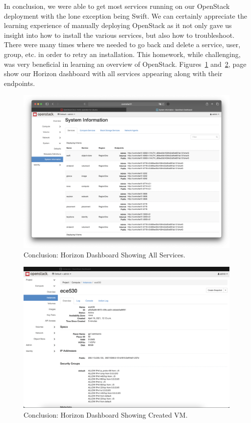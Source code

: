 \documentclass{article}
\begin{document}
In conclusion, we were able to get most services running on our OpenStack deployment with the lone exception being Swift. We can certainly appreciate the learning experience of manually deploying OpenStack as it not only gave us insight into how to install the various services, but also how to troubleshoot. There were many times where we needed to go back and delete a service, user, group, etc. in order to retry an installation. This homework, while challenging, was very beneficial in learning an overview of OpenStack. Figures~\ref{fig:HorizonComplete} and~\ref{fig:NovaComplete}, page~\pageref{fig:HorizonComplete} show our Horizon dashboard with all services appearing along with their endpoints.
\begin{figure}[ht]
    \centering
    \includegraphics[width=0.99\textwidth]{HorizonComplete.png}
    \caption{Conclusion: Horizon Dashboard Showing All Services.}
    \label{fig:HorizonComplete}
\end{figure}

\begin{figure}[ht]
    \centering
    \includegraphics[width=0.99\textwidth]{NovaComplete.png}
    \caption{Conclusion: Horizon Dashboard Showing Created VM.}
    \label{fig:NovaComplete}
\end{figure}
\end{document}
